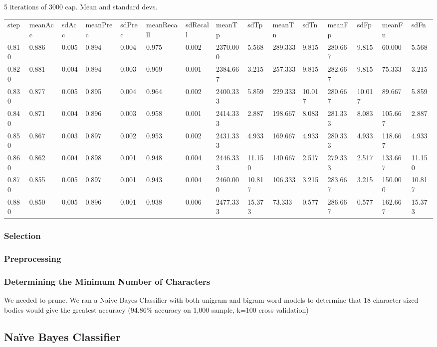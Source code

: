 \documentclass[10pt]{article}
\begin{document}
5 iterations of 3000 cap. Mean and standard devs.
\begin{tabular}{lllllllllllllll}
step & meanAcc & sdAcc & meanPrec & sdPrec & meanRecall & sdRecall & meanTp & sdTp & meanTn & sdTn & meanFp & sdFp & meanFn & sdFn \\
0.810 & 0.886 & 0.005 & 0.894 & 0.004 & 0.975 & 0.002 & 2370.000 & 5.568 & 289.333 & 9.815 & 280.667 & 9.815 & 60.000 & 5.568 \\
0.820 & 0.881 & 0.004 & 0.894 & 0.003 & 0.969 & 0.001 & 2384.667 & 3.215 & 257.333 & 9.815 & 282.667 & 9.815 & 75.333 & 3.215 \\
0.830 & 0.877 & 0.005 & 0.895 & 0.004 & 0.964 & 0.002 & 2400.333 & 5.859 & 229.333 & 10.017 & 280.667 & 10.017 & 89.667 & 5.859 \\
0.840 & 0.871 & 0.004 & 0.896 & 0.003 & 0.958 & 0.001 & 2414.333 & 2.887 & 198.667 & 8.083 & 281.333 & 8.083 & 105.667 & 2.887 \\
0.850 & 0.867 & 0.003 & 0.897 & 0.002 & 0.953 & 0.002 & 2431.333 & 4.933 & 169.667 & 4.933 & 280.333 & 4.933 & 118.667 & 4.933 \\
0.860 & 0.862 & 0.004 & 0.898 & 0.001 & 0.948 & 0.004 & 2446.333 & 11.150 & 140.667 & 2.517 & 279.333 & 2.517 & 133.667 & 11.150 \\
0.870 & 0.855 & 0.005 & 0.897 & 0.001 & 0.943 & 0.004 & 2460.000 & 10.817 & 106.333 & 3.215 & 283.667 & 3.215 & 150.000 & 10.817 \\
0.880 & 0.850 & 0.005 & 0.896 & 0.001 & 0.938 & 0.006 & 2477.333 & 15.373 & 73.333 & 0.577 & 286.667 & 0.577 & 162.667 & 15.373
\end{tabular}
\subsubsection{Selection}
\label{sec-2-2-2}
\subsubsection{Preprocessing}
\label{sec-2-2-3}
\subsubsection{Determining the Minimum Number of Characters}
\label{sec-2-2-4}

We needed to prune. We ran a Naive Bayes Classifier with both unigram and
bigram word models to determine that 18 character sized bodies would give the
greatest accuracy (94.86\% accuracy on 1,000 sample, k=100 cross validation)
\subsection{Naïve Bayes Classifier}
\label{sec-2-3}
\end{document}
